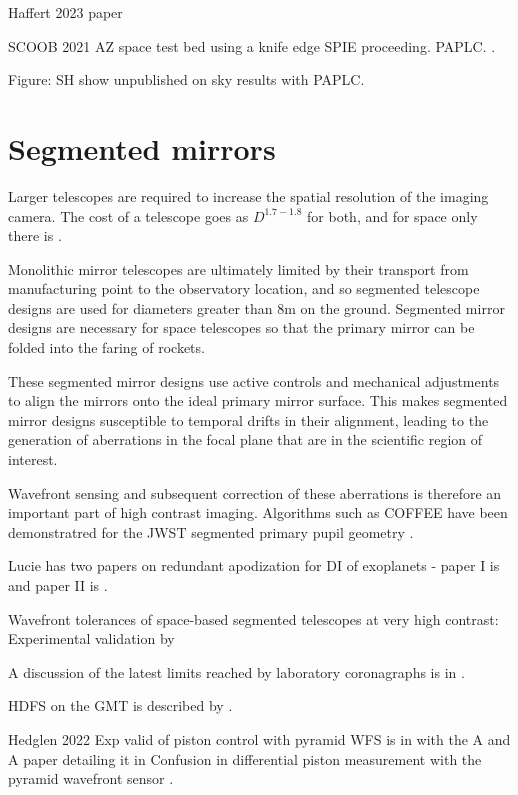 \documentclass[letterpaper]{ar-1col}
\begin{document}
Haffert 2023 paper

SCOOB 2021 AZ space test bed \citep{Ashcraft22} using a knife edge SPIE proceeding. PAPLC. \citep{vanGorkom22}.

Figure: SH show unpublished on sky results with PAPLC.

\section{Segmented mirrors}

Larger telescopes are required to increase the spatial resolution of the imaging camera. The cost of a telescope goes as $D^{1.7-1.8}$ \citep{Stahl20} for both, and for space only there is \citet{Stahl10}.
 
Monolithic mirror telescopes are ultimately limited by their transport from manufacturing point to the observatory location, and so segmented telescope designs are used for diameters greater than 8m on the ground.
 Segmented mirror designs are necessary for space telescopes so that the primary mirror can be folded into the faring of rockets.

These segmented mirror designs use active controls and mechanical adjustments to align the mirrors onto the ideal primary mirror surface.
%
This makes segmented mirror designs susceptible to temporal drifts in their alignment, leading to the generation of aberrations in the focal plane that are in the scientific region of interest.

Wavefront sensing and subsequent correction of these aberrations is therefore an important part of high contrast imaging.
%
Algorithms such as COFFEE have been demonstratred for the JWST segmented primary pupil geometry \citep{Leboulleux20}.

Lucie has two papers on redundant apodization for DI of exoplanets - paper I is \citep{Leboulleux22} and paper II is \citet{Leboulleux22a}.

Wavefront tolerances of space-based segmented telescopes at very high contrast: Experimental validation by \citet{Laginja22}

A discussion of the latest limits reached by laboratory coronagraphs is in \citet{Mennesson24}.



HDFS on the GMT is described by \citet{Haffert22}.

Hedglen 2022 Exp valid of piston control with pyramid WFS is in \citet{Bertrou-Cantou23} with the A and A paper detailing it in Confusion in differential piston measurement with the pyramid wavefront sensor \citep{Bertrou-Cantou22}.
\end{document}
